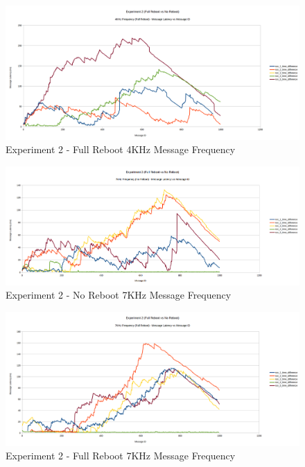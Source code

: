 \documentclass{l4proj}
\begin{document}
\begin{appendices}
\begin{figure}
\centering
\includegraphics[width=\textwidth]{images/full-reboot-4khz.png}
\caption{Experiment 2 - Full Reboot 4KHz Message Frequency}
\label{exp2-fullreboot-4khz}
\end{figure}

\begin{figure}
\centering
\includegraphics[width=\textwidth]{images/no-reboot-7khz.png}
\caption{Experiment 2 - No Reboot 7KHz Message Frequency}
\label{exp2-noreboot-7khz}
\end{figure}

\begin{figure}
\centering
\includegraphics[width=\textwidth]{images/full-reboot-7khz.png}
\caption{Experiment 2 - Full Reboot 7KHz Message Frequency}
\label{exp2-fullreboot-7khz}
\end{figure}


\end{appendices}
\end{document}
